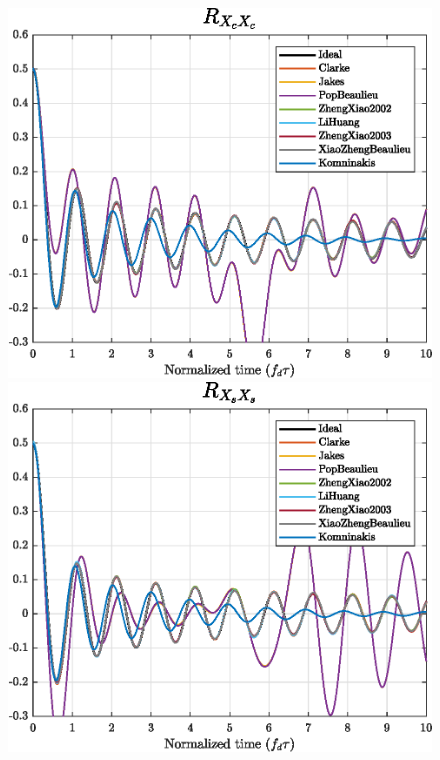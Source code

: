 \begin{figure}
	\hfill
	\begin{minipage}{.49\linewidth}
		\includegraphics[width=\linewidth]{img/XcXc.eps}
	\end{minipage}
	\hfill
	\begin{minipage}{.49\linewidth}
		\includegraphics[width=\linewidth]{img/XsXs.eps}
	\end{minipage}
	\hfill
	

\end{figure}
